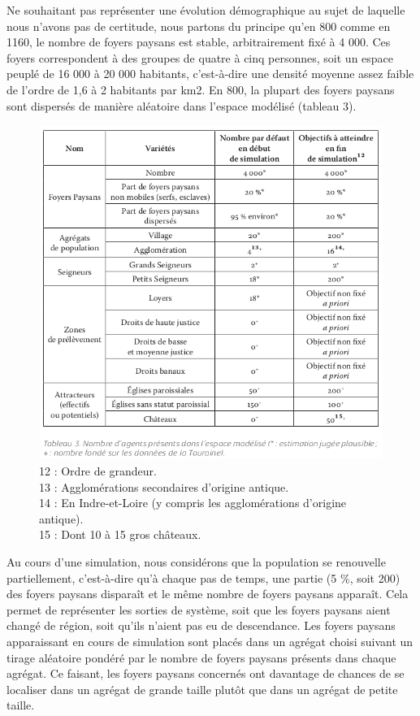 Ne souhaitant pas représenter une évolution démographique au sujet de laquelle nous n'avons pas de certitude, nous partons du principe qu'en 800 comme en 1160, le nombre de foyers paysans est stable, arbitrairement fixé à 4 000.
Ces foyers correspondent à des groupes de quatre à cinq personnes, soit un espace peuplé de 16 000 à 20 000 habitants, c'est-à-dire une densité moyenne assez faible de l'ordre de 1,6 à 2 habitants par km2.
En 800, la plupart des foyers paysans sont dispersés de manière aléatoire dans l'espace modélisé (tableau 3).

\begin{figure}[H]
	\centering
	\includegraphics[width=1\linewidth]{src/Chapitre_TMD/Tab3.png}
	\caption*{
		\small
		12 : Ordre de grandeur.\\
		13 : Agglomérations secondaires d’origine antique. \\
		14 : En Indre-et-Loire (y compris les agglomérations d’origine antique).\\
		15 : Dont 10 à 15 gros châteaux.
}
\end{figure}

Au cours d'une simulation, nous considérons que la population se renouvelle partiellement, c'est-à-dire qu'à chaque pas de temps, une partie (5 \%, soit 200) des foyers paysans disparaît et le même nombre de foyers paysans apparaît.
Cela permet de représenter les sorties de système, soit que les foyers paysans aient changé de région, soit qu'ils n'aient pas eu de descendance. 
Les foyers paysans apparaissant en cours de simulation sont placés dans un agrégat choisi suivant un tirage aléatoire pondéré par le nombre de foyers paysans présents dans chaque agrégat.
Ce faisant, les foyers paysans concernés ont davantage de chances de se localiser dans un agrégat de grande taille plutôt que dans un agrégat de petite taille.

